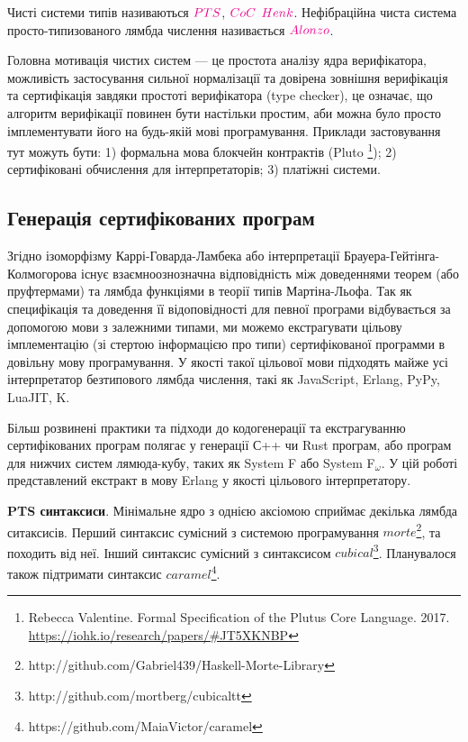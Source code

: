 Чисті системи типів називаються $\textcolor{magenta}{PTS}$, $\textcolor{magenta}{CoC}$
$\textcolor{magenta}{Henk}$. Нефібраційна чиста система просто-типизованого лямбда числення
називається $\textcolor{magenta}{Alonzo}$.

Головна мотивація чистих систем --- це простота аналізу ядра верифікатора,
можливість застосування сильної нормалізації та довірена зовнішня верифікація
та сертифікація завдяки простоті верифікатора (type checker), це означає, що
алгоритм верифікації повинен бути настільки простим, аби можна було
просто імплементувати його на будь-якій мові програмування. Приклади застовування
тут можуть бути:
1) формальна мова блокчейн контрактів (Pluto
   \footnote{Rebecca Valentine. Formal Specification of the Plutus Core Language. 2017.
             \url{https://iohk.io/research/papers/#JT5XKNBP}});
2) сертифіковані обчислення для інтерпретаторів;
3) платіжні системи.

\subsection{Генерація сертифікованих програм}
Згідно ізоморфізму Каррі-Говарда-Ламбека або інтерпретації Брауера-Гейтінга-Колмогорова
існує взаємноознозначна відповідність між доведеннями теорем (або пруфтермами)
та лямбда функціями в теорії типів Мартіна-Льофа\cite{Lof84}.
Так як специфікація та доведення її відоповідності для певної програми
відбувається за допомогою мови з залежними типами, ми можемо екстрагувати
цільову імплементацію (зі стертою інформацією про типи) сертифікованої программи
в довільну мову програмування. У якості такої цільової мови підходять
майже усі інтерпретатор безтипового лямбда числення, такі як JavaScript,
Erlang, PyPy, LuaJIT, K.

Більш розвинені практики та підходи до кодогенерації та екстрагуванню
сертифікованих програм полягає у генерації С++ чи Rust програм, або програм
для нижчих систем лямюда-кубу, таких як System F або System F$_\omega$.
У цій роботі представлений екстракт в мову Erlang у якості цільового інтерпретатору.

\textbf{PTS синтаксиси}. Мінімальне ядро з однією аксіомою
сприймає декілька лямбда ситаксисів.
Перший синтаксис сумісний з системою програмування
$morte$\footnote{http://github.com/Gabriel439/Haskell-Morte-Library}, та походить від неї.
Інший синтаксис сумісний з синтаксисом $cubical$\footnote{http://github.com/mortberg/cubicaltt}.
Планувалося також підтримати синтаксис $caramel$\footnote{https://github.com/MaiaVictor/caramel}.

